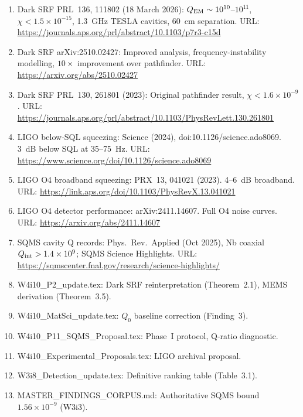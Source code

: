 \documentclass[11pt]{article}
\newcommand{\ee}[1]{\times 10^{#1}}
\newcommand{\QEM}{Q_{\rm EM}}
\theoremstyle{definition}
\theoremstyle{remark}
\begin{document}
\begin{enumerate}[nosep]
\item Dark SRF PRL~136, 111802 (18 March 2026): $\QEM \sim 10^{10}$--$10^{11}$,
  $\chi < 1.5\ee{-15}$, 1.3~GHz TESLA cavities, 60~cm separation.
  URL: \url{https://journals.aps.org/prl/abstract/10.1103/p7r3-c15d}
\item Dark SRF arXiv:2510.02427: Improved analysis, frequency-instability
  modelling, $10\times$ improvement over pathfinder.
  URL: \url{https://arxiv.org/abs/2510.02427}
\item Dark SRF PRL~130, 261801 (2023): Original pathfinder result,
  $\chi < 1.6\ee{-9}$.
  URL: \url{https://journals.aps.org/prl/abstract/10.1103/PhysRevLett.130.261801}
\item LIGO below-SQL squeezing: Science (2024), doi:10.1126/science.ado8069.
  3~dB below SQL at 35--75~Hz.
  URL: \url{https://www.science.org/doi/10.1126/science.ado8069}
\item LIGO O4 broadband squeezing: PRX~13, 041021 (2023). 4--6~dB broadband.
  URL: \url{https://link.aps.org/doi/10.1103/PhysRevX.13.041021}
\item LIGO O4 detector performance: arXiv:2411.14607. Full O4 noise curves.
  URL: \url{https://arxiv.org/abs/2411.14607}
\item SQMS cavity Q records: Phys.\ Rev.\ Applied (Oct 2025), Nb coaxial
  $Q_{\rm int} > 1.4\ee{9}$; SQMS Science Highlights.
  URL: \url{https://sqmscenter.fnal.gov/research/science-highlights/}
\item W4i10\_P2\_update.tex: Dark SRF reinterpretation (Theorem~2.1),
  MEMS derivation (Theorem~3.5).
\item W4i10\_MatSci\_update.tex: $Q_0$ baseline correction (Finding~3).
\item W4i10\_P11\_SQMS\_Proposal.tex: Phase~I protocol, Q-ratio diagnostic.
\item W4i10\_Experimental\_Proposals.tex: LIGO archival proposal.
\item W3i8\_Detection\_update.tex: Definitive ranking table (Table~3.1).
\item MASTER\_FINDINGS\_CORPUS.md: Authoritative SQMS bound $1.56\ee{-9}$ (W3i3).
\end{enumerate}
\end{document}

